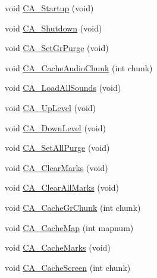 \begin{DoxyCompactItemize}
void \hyperlink{ID__CA_8H_a4a88bf7bd8bef6188a34abe153f071e0}{CA\_\-Startup} (void)
\item 
void \hyperlink{ID__CA_8H_a322853b8f928f900e628b0b5d9dd20c7}{CA\_\-Shutdown} (void)
\item 
void \hyperlink{ID__CA_8H_aa71d55f13e89f4276b8ff1d161a51815}{CA\_\-SetGrPurge} (void)
\item 
void \hyperlink{ID__CA_8H_a3a6c27701a37987c16cd4d4a885db478}{CA\_\-CacheAudioChunk} (int chunk)
\item 
void \hyperlink{ID__CA_8H_aa17596e9e057c980117d560cab6c876e}{CA\_\-LoadAllSounds} (void)
\item 
void \hyperlink{ID__CA_8H_a05669e481a711870643e4c9cb2c00c93}{CA\_\-UpLevel} (void)
\item 
void \hyperlink{ID__CA_8H_ab0634ac6163eb8b9e51839469f094bc4}{CA\_\-DownLevel} (void)
\item 
void \hyperlink{ID__CA_8H_a20eee13eb260608d4612aafc05ffc246}{CA\_\-SetAllPurge} (void)
\item 
void \hyperlink{ID__CA_8H_aadc64e6b6e9b1c11f2dd11282662572e}{CA\_\-ClearMarks} (void)
\item 
void \hyperlink{ID__CA_8H_af52e0508cf825cf10a933d377abe764d}{CA\_\-ClearAllMarks} (void)
\item 
void \hyperlink{ID__CA_8H_a33faa9e016da5c7e605f67f5c7ecf2a0}{CA\_\-CacheGrChunk} (int chunk)
\item 
void \hyperlink{ID__CA_8H_a47feb1d5d4fc9fdd76732533b42a2a73}{CA\_\-CacheMap} (int mapnum)
\item 
void \hyperlink{ID__CA_8H_a258ef34640d9cb05e8a1e6c4e2f8eb5b}{CA\_\-CacheMarks} (void)
\item 
void \hyperlink{ID__CA_8H_a61ed1e53a23fd4c6ef784e6ec7ae73d2}{CA\_\-CacheScreen} (int chunk)
\end{DoxyCompactItemize}
